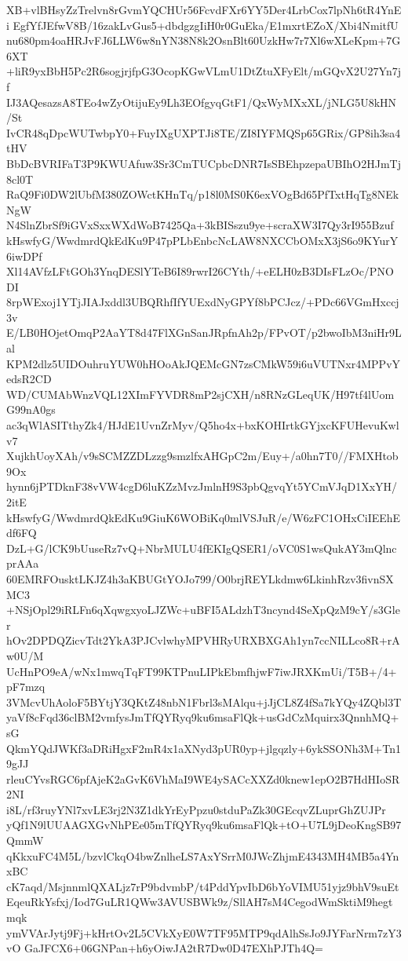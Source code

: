 XB+vlBHsyZzTrelvn8rGvmYQCHUr56FcvdFXr6YY5Der4LrbCox7lpNh6tR4YnEi
EgfYfJEfwV8B/16zakLvGus5+dbdgzgIiH0r0GuEka/E1mxrtEZoX/Xbi4NmitfU
nu680pm4oaHRJvFJ6LLW6w8nYN38N8k2OsnBlt60UzkHw7r7Xl6wXLeKpm+7G6XT
+liR9yxBbH5Pc2R6sogjrjfpG3OcopKGwVLmU1DtZtuXFyElt/mGQvX2U27Yn7jf
IJ3AQesazsA8TEo4wZyOtijuEy9Lh3EOfgyqGtF1/QxWyMXxXL/jNLG5U8kHN/St
IvCR48qDpcWUTwbpY0+FuyIXgUXPTJi8TE/ZI8IYFMQSp65GRix/GP8ih3sa4tHV
BbDcBVRIFaT3P9KWUAfuw3Sr3CmTUCpbcDNR7IsSBEhpzepaUBIhO2HJmTj8cl0T
RaQ9Fi0DW2lUbfM380ZOWctKHnTq/p18l0MS0K6exVOgBd65PfTxtHqTg8NEkNgW
N4SlnZbrSf9iGVxSxxWXdWoB7425Qa+3kBISszu9ye+scraXW3I7Qy3rI955Bzuf
kHswfyG/WwdmrdQkEdKu9P47pPLbEnbcNcLAW8NXCCbOMxX3jS6o9KYurY6iwDPf
Xl14AVfzLFtGOh3YnqDESlYTeB6I89rwrI26CYth/+eELH0zB3DIsFLzOc/PNODI
8rpWExoj1YTjJIAJxddl3UBQRhfIfYUExdNyGPYf8bPCJcz/+PDc66VGmHxccj3v
E/LB0HOjetOmqP2AaYT8d47FlXGnSanJRpfnAh2p/FPvOT/p2bwoIbM3niHr9Lal
KPM2dlz5UIDOuhruYUW0hHOoAkJQEMcGN7zsCMkW59i6uVUTNxr4MPPvYedsR2CD
WD/CUMAbWnzVQL12XImFYVDR8mP2sjCXH/n8RNzGLeqUK/H97tf4lUomG99nA0gs
ac3qWlASITthyZk4/HJdE1UvnZrMyv/Q5ho4x+bxKOHIrtkGYjxcKFUHevuKwlv7
XujkhUoyXAh/v9sSCMZZDLzzg9smzlfxAHGpC2m/Euy+/a0hn7T0//FMXHtob9Ox
hynn6jPTDknF38vVW4cgD6luKZzMvzJmlnH9S3pbQgvqYt5YCmVJqD1XxYH/2itE
kHswfyG/WwdmrdQkEdKu9GiuK6WOBiKq0mlVSJuR/e/W6zFC1OHxCiIEEhEdf6FQ
DzL+G/lCK9bUuseRz7vQ+NbrMULU4fEKIgQSER1/oVC0S1wsQukAY3mQlncprAAa
60EMRFOusktLKJZ4h3aKBUGtYOJo799/O0brjREYLkdmw6LkinhRzv3fivnSXMC3
+NSjOpl29iRLFn6qXqwgxyoLJZWc+uBFI5ALdzhT3ncynd4SeXpQzM9cY/s3Gler
hOv2DPDQZicvTdt2YkA3PJCvlwhyMPVHRyURXBXGAh1yn7ccNILLco8R+rAw0U/M
UcHnPO9eA/wNx1mwqTqFT99KTPnuLIPkEbmfhjwF7iwJRXKmUi/T5B+/4+pF7mzq
3VMcvUhAoloF5BYtjY3QKtZ48nbN1Fbrl3sMAlqu+jJjCL8Z4fSa7kYQy4ZQbl3T
yaVf8cFqd36clBM2vmfysJmTfQYRyq9ku6msaFlQk+usGdCzMquirx3QnnhMQ+sG
QkmYQdJWKf3aDRiHgxF2mR4x1aXNyd3pUR0yp+jlgqzly+6ykSSONh3M+Tn19gJJ
rleuCYvsRGC6pfAjeK2aGvK6VhMaI9WE4ySACcXXZd0knew1epO2B7HdHIoSR2NI
i8L/rf3ruyYNl7xvLE3rj2N3Z1dkYrEyPpzu0stduPaZk30GEcqvZLuprGhZUJPr
yQf1N9lUUAAGXGvNhPEe05mTfQYRyq9ku6msaFlQk+tO+U7L9jDeoKngSB97QmmW
qKkxuFC4M5L/bzvlCkqO4bwZnlheLS7AxYSrrM0JWcZhjmE4343MH4MB5a4YnxBC
cK7aqd/MsjnnmlQXALjz7rP9bdvmbP/t4PddYpvIbD6bYoVIMU51yjz9bhV9suEt
EqeuRkYsfxj/Iod7GuLR1QWw3AVUSBWk9z/SllAH7sM4CegodWmSktiM9hegtmqk
ymVVArJytj9Fj+kHrtOv2L5CVkXyE0W7TF95MTP9qdAlhSsJo9JYFarNrm7zY3vO
GaJFCX6+06GNPan+h6yOiwJA2tR7Dw0D47EXhPJTh4Q=
